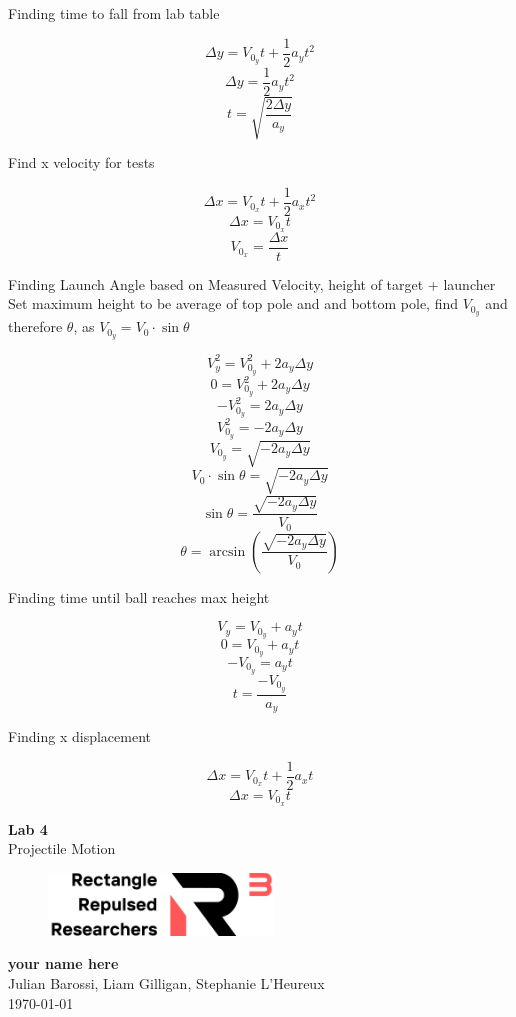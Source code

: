\documentclass[11pt, letterpaper, includehead]{article}
\begin{document}
Finding time to fall from lab table

$$\Delta y = V_{0_y}t + \frac{1}{2}a_yt^2$$
$$\Delta y = \frac{1}{2}a_yt^2$$
$$t = \sqrt{\frac{2\Delta y}{a_y}}$$


Find x velocity for tests

$$\Delta x = V_{0_x}t + \frac{1}{2}a_xt^2$$
$$\Delta x = V_{0_x}t$$
$$V_{0_x} = \frac{\Delta x}{t}$$






Finding Launch Angle based on Measured Velocity, height of target + launcher\\

Set maximum height to be average of top pole and and bottom pole, find $V_{0_y}$ and therefore $\theta$,
as $V_{0_y} = V_0\cdot\sin\theta$

$$V_y^2 = V_{0_y}^2 + 2a_y\Delta y$$
$$0 = V_{0_y}^2 + 2a_y\Delta y$$
$$-V_{0_y}^2 = 2a_y\Delta y$$
$$V_{0_y}^2 = -2a_y\Delta y$$
$$V_{0_y} = \sqrt{-2a_y\Delta y}$$
$$V_0\cdot\sin\theta = \sqrt{-2a_y\Delta y}$$
$$\sin\theta = \frac{\sqrt{-2a_y\Delta y}}{V_0}$$
$$\theta = \arcsin\left(\frac{\sqrt{-2a_y\Delta y}}{V_0}\right)$$

Finding time until ball reaches max height

$$V_y = V_{0_y} + a_yt$$
$$0 = V_{0_y} + a_yt$$
$$-V_{0_y} = a_yt$$
$$t = \frac{-V_{0_y}}{a_y}$$

Finding x displacement

$$\Delta x = V_{0_x}t + \frac{1}{2}a_xt$$
$$\Delta x = V_{0_x}t$$


\begin{titlepage}
  \begin{center}
    \Huge{\textbf{Lab 4}}\\
    \Huge{Projectile Motion}
    \vfill
    \begin{figure}[H] %
      \centering 
      \includegraphics[width=6cm]{../logo.png}
    \end{figure}
    \large{\textbf{your name here}}\\
    \large{Julian Barossi, Liam Gilligan, Stephanie L'Heureux}\\
    \vspace{0.5cm}
    \normalsize
    \today
  \end{center}
\end{titlepage}
\end{document}
